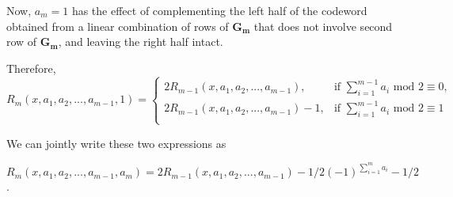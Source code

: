 {Now, $a_m=1$ has the effect of complementing the left half of the
codeword obtained from a linear combination of rows of
$\mathbf{G_m}$ that does not involve second row of $\mathbf{G_m}$,
and leaving the right half intact.

Therefore,
\[ R_m(x,a_1,a_2,...,a_{m-1},1)=\left\{
\begin{array}{ll}
    2R_{m-1}(x,a_1,a_2,...,a_{m-1}), & \text{if $\sum_{i=1}^{m-1} a_i$ mod $2 \equiv 0$,}\\
    2R_{m-1}(x,a_1,a_2,...,a_{m-1})-1, & \text{if $\sum_{i=1}^{m-1} a_i$ mod $2 \equiv 1$}\\
\end{array}
\right. \]

We can jointly write these two expressions as

$R_m(x,a_1,a_2,...,a_{m-1},a_m)=2R_{m-1}(x,a_1,a_2,...,a_{m-1})-1/2(-1)^{\sum_{i=1}^m
a_i}-1/2$.


}
